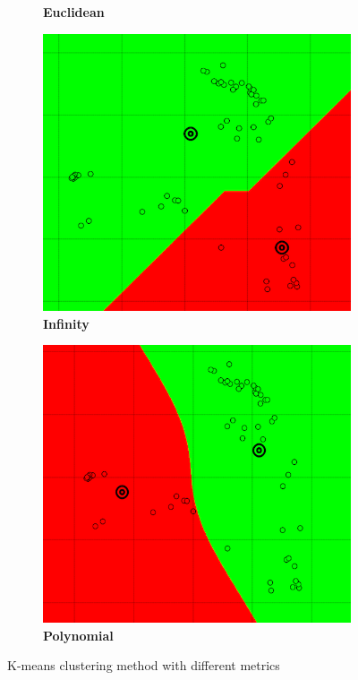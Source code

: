 \begin{figure} [ht]
\begin{subfigure}[h]{0.23\textwidth}
	\caption{\bf Euclidean}
    \end{subfigure}
    \begin{subfigure}[h]{0.23\textwidth}
    \centering
   \includegraphics[height=0.14\textheight]{./clustering/l0norm.png}
	\caption{\bf Infinity}
    \end{subfigure}
    \begin{subfigure}[h]{0.23\textwidth}
    \centering
    \includegraphics[height=0.14\textheight]{./clustering/lpnorm.png}
	\caption{\bf Polynomial}
    \end{subfigure}
\caption{K-means clustering method with different metrics}
\label{fig:figure4}
\end{figure}
